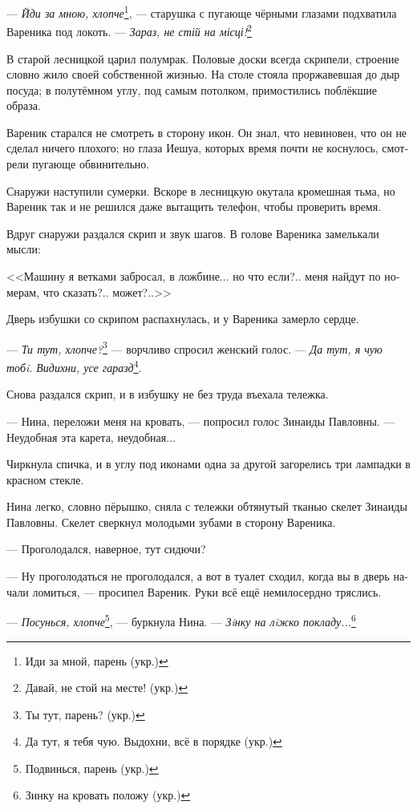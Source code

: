 \documentclass[a5paper,12pt,fleqn]{extbook}\usepackage{cooltooltips}\usepackage{polyglossia}\setdefaultlanguage[babelshorthands=true]{russian}\setotherlanguage{english}\defaultfontfeatures{Ligatures=TeX,Mapping=tex-text} \usepackage{xcolor}\definecolor{lightgray}{HTML}{bbbbbb}\color{lightgray}\newcommand{\ml}[3]{\textenglish{\textcolor{black}{#3}}}
\newcommand{\asterism}{\vspace{1em}{\centering\Large\bfseries$\ast~\ast~\ast$\par}\vspace{1em}}
\begin{document}
--- \textit{Йди за мною, хлопче}\footnote{Иди за мной, парень (укр.)}, --- старушка с пугающе чёрными глазами подхватила Вареника под локоть.
--- \textit{Зараз, не стій на місці!}\footnote{Давай, не стой на месте! (укр.)}

\asterism

В старой лесницкой царил полумрак.
Половые доски всегда скрипели, строение словно жило своей собственной жизнью.
На столе стояла проржавевшая до дыр посуда;
в полутёмном углу, под самым потолком, примостились поблёкшие образа.

Вареник старался не смотреть в сторону икон.
Он знал, что невиновен, что он не сделал ничего плохого;
но глаза Иешуа, которых время почти не коснулось, смотрели пугающе обвинительно.

Снаружи наступили сумерки.
Вскоре в лесницкую окутала кромешная тьма, но Вареник так и не решился даже вытащить телефон, чтобы проверить время.

Вдруг снаружи раздался скрип и звук шагов.
В голове Вареника замелькали мысли:

<<Машину я ветками забросал, в ложбине... но что если?.. меня найдут по номерам, что сказать?.. может?..>>

Дверь избушки со скрипом распахнулась, и у Вареника замерло сердце.

--- \textit{Ти тут, хлопче?}\footnote{Ты тут, парень? (укр.)} --- ворчливо спросил женский голос.
--- \textit{Да тут, я чую тобi.}
\textit{Видихни, усе гаразд}\footnote{Да тут, я тебя чую. Выдохни, всё в порядке (укр.)}.

Снова раздался скрип, и в избушку не без труда въехала тележка.

--- Нина, переложи меня на кровать, --- попросил голос Зинаиды Павловны.
--- Неудобная эта карета, неудобная...

Чиркнула спичка, и в углу под иконами одна за другой загорелись три лампадки в красном стекле.

Нина легко, словно пёрышко, сняла с тележки обтянутый тканью скелет Зинаиды Павловны.
Скелет сверкнул молодыми зубами в сторону Вареника.

--- Проголодался, наверное, тут сидючи?

--- Ну проголодаться не проголодался, а вот в туалет сходил, когда вы в дверь начали ломиться, --- просипел Вареник.
Руки всё ещё немилосердно тряслись.

--- \textit{Посунься, хлопче}\footnote{Подвинься, парень (укр.)}, --- буркнула Нина.
--- \textit{Зiнку на лiжко покладу...}\footnote{Зинку на кровать положу (укр.)}
\end{document}
